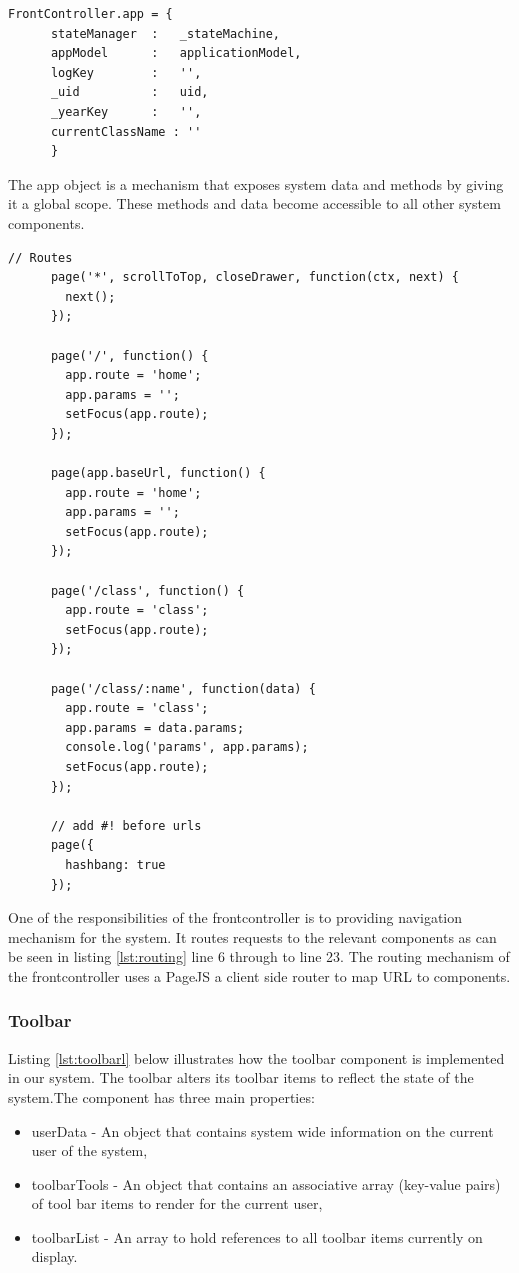 \begin{lstlisting}[caption={Frontcontroller app model}, label={lst:FrontControllerAppModel}]
    FrontController.app = {
      stateManager  :   _stateMachine,
      appModel      :   applicationModel,
      logKey        :   '',
      _uid          :   uid,
      _yearKey      :   '',
      currentClassName : ''
      }
\end{lstlisting}
The app object is a mechanism that exposes system data and methods by giving it a global scope. These methods and data become accessible to all other system components.

\begin{lstlisting}[caption={Routing by frontcontroller}, label={lst:routing}]
    // Routes
      page('*', scrollToTop, closeDrawer, function(ctx, next) {
        next();
      });

      page('/', function() {
        app.route = 'home';
        app.params = '';
        setFocus(app.route);
      });

      page(app.baseUrl, function() {
        app.route = 'home';
        app.params = '';
        setFocus(app.route);
      });

      page('/class', function() {
        app.route = 'class';
        setFocus(app.route);
      });

      page('/class/:name', function(data) {
        app.route = 'class';
        app.params = data.params;
        console.log('params', app.params);
        setFocus(app.route);
      });

      // add #! before urls
      page({
        hashbang: true
      });
\end{lstlisting}

One of the responsibilities of the frontcontroller is to providing navigation mechanism for the system. It routes requests to the relevant components as can be seen in listing \ref{lst:routing} line 6 through to line 23. The routing mechanism of the frontcontroller uses a PageJS \cite{website:VisionMedia} a client side router to map URL to components.  

\subsubsection{Toolbar}
Listing \ref{lst:toolbarl} below illustrates how the toolbar component is implemented in our system. The toolbar alters its toolbar items to reflect the state of the system.The component has three main properties:
\begin{itemize}
    \item userData - An object that contains system wide information on the current user of the system,
    \item toolbarTools - An object that contains an associative array (key-value pairs) of tool bar items to render for the current user,
    \item toolbarList - An array to hold references to all toolbar items currently on display. 
\end{itemize}

